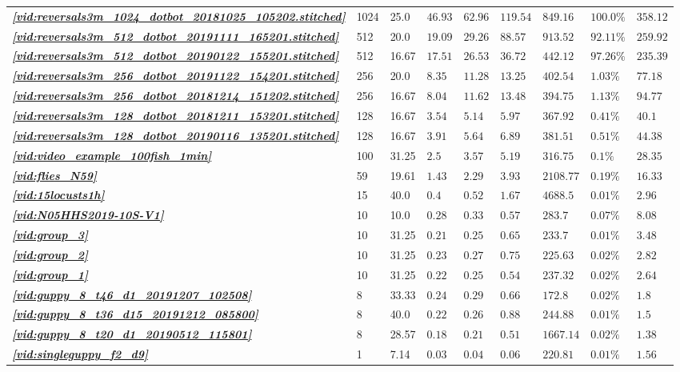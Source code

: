 \documentclass[9pt,lineno]{elife}
\newcommand{\vidref}[1]{\textit{\textbf{\ref{#1}}}}
\begin{document}
\begin{table}
\begin{tabular}{l l l | l l l l l | l}
\rowcolor{Gray} \vidref{vid:reversals3m_1024_dotbot_20181025_105202.stitched} & 1024 & 25.0 & $ 46.93 $ & $ 62.96 $ & $ 119.54 $ & $ 849.16 $ & $ 100.0 \%$ & $ 358.12 $ \\
\rowcolor{Gray} \vidref{vid:reversals3m_512_dotbot_20191111_165201.stitched} & 512 & 20.0 & $ 19.09 $ & $ 29.26 $ & $ 88.57 $ & $ 913.52 $ & $ 92.11 \%$ & $ 259.92 $ \\
\rowcolor{Gray} \vidref{vid:reversals3m_512_dotbot_20190122_155201.stitched} & 512 & 16.67 & $ 17.51 $ & $ 26.53 $ & $ 36.72 $ & $ 442.12 $ & $ 97.26 \%$ & $ 235.39 $ \\
 \vidref{vid:reversals3m_256_dotbot_20191122_154201.stitched} & 256 & 20.0 & $ 8.35 $ & $ 11.28 $ & $ 13.25 $ & $ 402.54 $ & $ 1.03 \%$ & $ 77.18 $ \\
 \vidref{vid:reversals3m_256_dotbot_20181214_151202.stitched} & 256 & 16.67 & $ 8.04 $ & $ 11.62 $ & $ 13.48 $ & $ 394.75 $ & $ 1.13 \%$ & $ 94.77 $ \\
 \vidref{vid:reversals3m_128_dotbot_20181211_153201.stitched} & 128 & 16.67 & $ 3.54 $ & $ 5.14 $ & $ 5.97 $ & $ 367.92 $ & $ 0.41 \%$ & $ 40.1 $ \\
 \vidref{vid:reversals3m_128_dotbot_20190116_135201.stitched} & 128 & 16.67 & $ 3.91 $ & $ 5.64 $ & $ 6.89 $ & $ 381.51 $ & $ 0.51 \%$ & $ 44.38 $ \\
 \vidref{vid:video_example_100fish_1min} & 100 & 31.25 & $ 2.5 $ & $ 3.57 $ & $ 5.19 $ & $ 316.75 $ & $ 0.1 \%$ & $ 28.35 $ \\
 \vidref{vid:flies_N59} & 59 & 19.61 & $ 1.43 $ & $ 2.29 $ & $ 3.93 $ & $ 2108.77 $ & $ 0.19 \%$ & $ 16.33 $ \\
 \vidref{vid:15locusts1h} & 15 & 40.0 & $ 0.4 $ & $ 0.52 $ & $ 1.67 $ & $ 4688.5 $ & $ 0.01 \%$ & $ 2.96 $ \\
 \vidref{vid:N05HHS2019-10S-V1} & 10 & 10.0 & $ 0.28 $ & $ 0.33 $ & $ 0.57 $ & $ 283.7 $ & $ 0.07 \%$ & $ 8.08 $ \\
 \vidref{vid:group_3} & 10 & 31.25 & $ 0.21 $ & $ 0.25 $ & $ 0.65 $ & $ 233.7 $ & $ 0.01 \%$ & $ 3.48 $ \\
 \vidref{vid:group_2} & 10 & 31.25 & $ 0.23 $ & $ 0.27 $ & $ 0.75 $ & $ 225.63 $ & $ 0.02 \%$ & $ 2.82 $ \\
 \vidref{vid:group_1} & 10 & 31.25 & $ 0.22 $ & $ 0.25 $ & $ 0.54 $ & $ 237.32 $ & $ 0.02 \%$ & $ 2.64 $ \\
 \vidref{vid:guppy_8_t46_d1_20191207_102508} & 8 & 33.33 & $ 0.24 $ & $ 0.29 $ & $ 0.66 $ & $ 172.8 $ & $ 0.02 \%$ & $ 1.8 $ \\
 \vidref{vid:guppy_8_t36_d15_20191212_085800} & 8 & 40.0 & $ 0.22 $ & $ 0.26 $ & $ 0.88 $ & $ 244.88 $ & $ 0.01 \%$ & $ 1.5 $ \\
 \vidref{vid:guppy_8_t20_d1_20190512_115801} & 8 & 28.57 & $ 0.18 $ & $ 0.21 $ & $ 0.51 $ & $ 1667.14 $ & $ 0.02 \%$ & $ 1.38 $ \\
 \vidref{vid:singleguppy_f2_d9} & 1 & 7.14 & $ 0.03 $ & $ 0.04 $ & $ 0.06 $ & $ 220.81 $ & $ 0.01 \%$ & $ 1.56 $ \\


\end{tabular}
\end{table}
\end{document}
